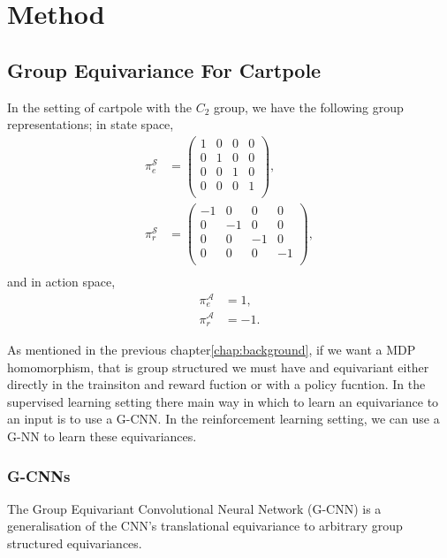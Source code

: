 \chapter{Method}\label{chap:method}
\section{Group Equivariance For Cartpole}
In the setting of cartpole with the $C_2$ group, we have the following group representations; in state space,
\begin{equation}
    \begin{aligned}
        \pi_e^{\mathcal{S}} &= \begin{pmatrix}
            1 & 0 & 0 & 0 \\
            0 & 1 & 0 & 0 \\ 
            0 & 0 & 1 & 0 \\
            0 & 0 & 0 & 1 \\
        \end{pmatrix}, \\
        \pi_r^{\mathcal{S}} &= \begin{pmatrix}
            -1 & 0 & 0 & 0 \\
            0 & -1 & 0 & 0 \\ 
            0 & 0 & -1 & 0 \\
            0 & 0 & 0 & -1 \\
        \end{pmatrix}, \\
    \end{aligned} 
\end{equation}
and in action space,
\begin{equation}
    \begin{aligned}
        \pi_e^{\mathcal{A}} &= 1, \\ 
        \pi_r^{\mathcal{A}} &= -1.
    \end{aligned}
\end{equation}

As mentioned in the previous chapter\ref{chap:background}, if we want a MDP homomorphism, that is group structured we must have and equivariant either directly in the trainsiton and reward fuction or with a policy fucntion. In the supervised learning setting there main way in which to learn an equivariance to an input is to use a G-CNN. In the reinforcement learning setting, we can use a G-NN to learn these equivariances.   

\subsection{G-CNNs}
The Group Equivariant Convolutional Neural Network (G-CNN) is a generalisation of the CNN's translational equivariance to arbitrary group structured equivariances. 

